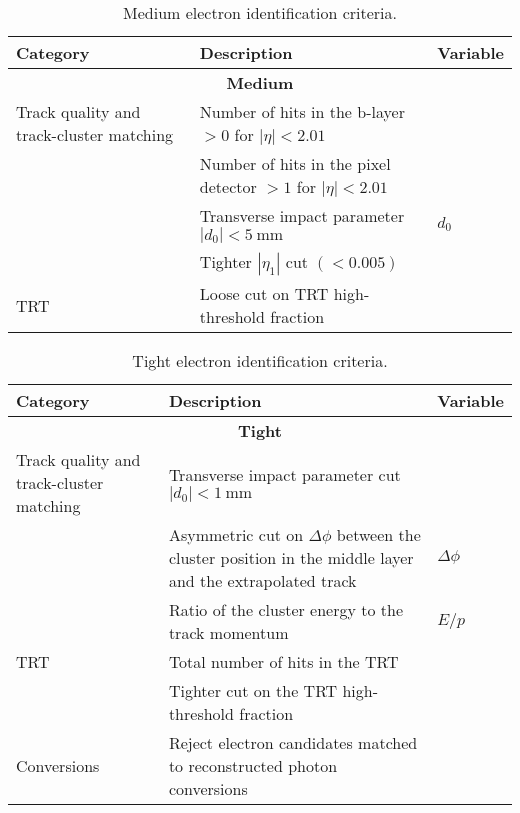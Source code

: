 \begin{table}[hbtp]
  \centering
  \begin{tabular}{@{}p{}p{}l@{}}
    \toprule
    Category & Description & Variable \\
    \midrule
    \multicolumn{3}{c}{\textbf{Medium}} \\
    Track quality and track-cluster matching & Number of hits in the b-layer $>0$ for $|\eta|<2.01$ \\
    & Number of hits in the pixel detector $>1$ for $|\eta|<2.01$ \\
    & Transverse impact parameter $|d_0|<\SI{5}{\mm}$ & $d_{0}$ \\
    & Tighter $|\eta_{1}|$ cut $(<0.005)$ \\
    TRT & Loose cut on TRT high-threshold fraction \\
    \bottomrule
  \end{tabular}
  \caption{Medium electron identification criteria.}\label{tab:DetectorAppElectronMedium}
\end{table}

\begin{table}[hbtp]
  \centering
    \begin{tabular}{@{}p{}p{}l@{}}
      \toprule
      Category & Description & Variable \\
      \midrule
      \multicolumn{3}{c}{\textbf{Tight}} \\ 
      Track quality and track-cluster matching & Transverse impact parameter cut $|d_0|<\SI{1}{\mm}$ \\ 
      & Asymmetric cut on $\Delta\phi$ between the cluster position in the middle layer and the extrapolated track & $\Delta\phi$ \\
      & Ratio of the cluster energy to the track momentum & $E/p$ \\
      TRT & Total number of hits in the TRT \\
      & Tighter cut on the TRT high-threshold fraction \\
      Conversions & Reject electron candidates matched to reconstructed photon conversions \\
      \bottomrule
    \end{tabular}
    \caption{Tight electron identification criteria.}\label{tab:DetectorAppElectronTight}
\end{table}
